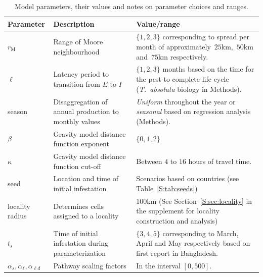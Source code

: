 \documentclass[11pt]{article}
\newcommand{\tuta}{\emph{T.~absoluta}}
\newcommand{\infest}{\rho}
\newcommand{\suitable}{\epsilon}
\newcommand{\asd}{\alpha_s}
\newcommand{\afm}{\alpha_{\ell}}
\newcommand{\ald}{\alpha_{\ell d}}
\newcommand{\mooreRange}{r_\mathrm{M}}
\theoremstyle{definition}
\begin{document}
\begin{table}[t]
\caption{Model parameters, their values and notes on parameter choices and
ranges.\label{tab:param}}
    \centering
	\small
{} %
    \begin{tabular}{p{}p{}p{}}
		\hline		
		Parameter & Description & Value/range \\
\hline		
\hline
$\mooreRange$ & Range of Moore neighbourhood & $\{1,2,3\}$ corresponding to
spread per month of 
approximately~$25$km,~$50$km and~$75$km
respectively. \\
$\ell$ & Latency period to transition from $E$ to $I$ & $\{1,2,3\}$ months
based on the time for the pest to complete life cycle (\tuta{} biology in
Methods). \\
season & Disaggregation of annual production to monthly values
& \emph{Uniform} throughout the year or \emph{seasonal} based on regression
analysis (Methods). \\
$\beta$ & Gravity model distance function exponent & $\{0,1,2\}$ \\
$\kappa$ & Gravity model distance function cut-off & Between $4$ to $16$ hours
of travel time. \\
seed & Location and time of initial infestation & Scenarios based on
countries (see Table~\ref{S:tab:seeds})\\
locality radius & Determines cells assigned to a locality & 100km (See
Section~\ref{S:sec:locality} in the supplement for locality construction
and analysis) \\\hline
$t_s$ & Time of initial infestation during parameterization & $\{3,4,5\}$ corresponding
to March, April and May respectively based on first report in
Bangladesh. \\
$\asd,\afm,\ald$ & Pathway scaling factors & In the interval $[0,500]$.\\
\hline
\end{tabular}
\end{table}
\end{document}
